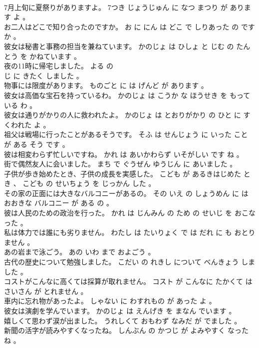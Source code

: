 \documentclass[8pt]{extreport}
\begin{document}
\begin{CJK}{UTF8}{min}
\\	7月上旬に夏祭りがありますよ。	7つき じょうじゅん に なつ まつり が あります よ 。 
\\	お二人はどこで知り合ったのですか。	お に にん は どこ で しりあった の です か 。 
\\	彼女は秘書と事務の担当を兼ねています。	かのじょ は ひしょ と じむ の たんとう を かねています 。 
\\	夜の11時に帰宅しました。	よる の 
\\	じ に きたく しました 。 
\\	物事には限度があります。	ものごと に は げんど が あります 。 
\\	彼女は高価な宝石を持っているわ。	かのじょ は こうか な ほうせき を もっている わ 。 
\\	彼女は通りがかりの人に救われたよ。	かのじょ は とおりがかり の ひと に すくわれた よ 。 
\\	祖父は戦場に行ったことがあるそうです。	そふ は せんじょう に いった こと が ある そう です 。 
\\	彼は相変わらず忙しいですね。	かれ は あいかわらず いそがしい です ね 。 
\\	街で偶然友人に会いました。	まち で ぐうぜん ゆうじん に あいました 。 
\\	子供が歩き始めたとき、子供の成長を実感した。	こども が あるきはじめた とき 、 こども の せいちょう を じっかん した 。 
\\	その家の正面には大きなバルコニーがあるの。	その いえ の しょうめん に は おおきな バルコニー が ある の 。 
\\	彼は人民のための政治を行った。	かれ は じんみん の ため の せいじ を おこなった 。 
\\	私は体力では誰にも劣りません。	わたし は たいりょく で は だれ に も おとりません 。 
\\	あの岩まで泳ごう。	あの いわ まで およごう 。 
\\	古代の歴史について勉強しました。	こだい の れきし について べんきょう しました 。 
\\	コストがこんなに高くては採算が取れません。	コスト が こんなに たかくて は さいさん が とれません 。 
\\	車内に忘れ物があったよ。	しゃない に わすれもの が あった よ 。 
\\	彼女は演劇を学んでいます。	かのじょ は えんげき を まなん でいます 。 
\\	嬉しくて思わず涙が出ました。	うれしくて おもわず なみだ が でました 。 
\\	新聞の活字が読みやすくなったね。	しんぶん の かつじ が よみやすく なった ね 。 

\end{CJK}
\end{document}

